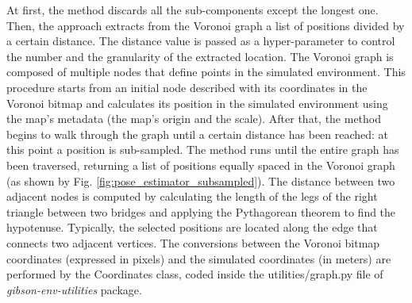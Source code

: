 At first, the method discards all the sub-components except the longest one. Then, the approach extracts from the Voronoi graph a list of positions divided by a certain distance. The distance value is passed as a hyper-parameter to control the number and the granularity of the extracted location. The Voronoi graph is composed of multiple nodes that define points in the simulated environment. This procedure starts from an initial node described with its coordinates in the Voronoi bitmap and calculates its position in the simulated environment using the map's metadata (the map's origin and the scale). After that, the method begins to walk through the graph until a certain distance has been reached: at this point a position is sub-sampled. The method runs until the entire graph has been traversed, returning a list of positions equally spaced in the Voronoi graph (as shown by Fig. \ref{fig:pose_estimator_subsampled}). The distance between two adjacent nodes is computed by calculating the length of the legs of the right triangle between two bridges and applying the Pythagorean theorem to find the hypotenuse. Typically, the selected positions are located along the edge that connects two adjacent vertices. The conversions between the Voronoi bitmap coordinates (expressed in pixels) and the simulated coordinates (in meters) are performed by the \textsf{Coordinates} class, coded inside the \textsf{utilities/graph.py} file of \textit{gibson-env-utilities} package.

